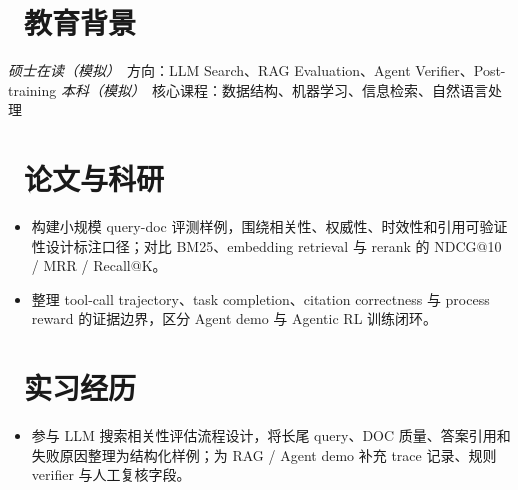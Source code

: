 \documentclass{resume}
\begin{document}


\small

\section{\faGraduationCap\ 教育背景}
\textit{硕士在读（模拟）}\ 方向：LLM Search、RAG Evaluation、Agent Verifier、Post-training
\datedsubsection{\textbf{某某大学}, 软件工程}{2021 -- 2025}
\textit{本科（模拟）}\ 核心课程：数据结构、机器学习、信息检索、自然语言处理

\section{\faBook\ 论文与科研}
\begin{itemize}[parsep=0.2ex]
  \item 构建小规模 query-doc 评测样例，围绕相关性、权威性、时效性和引用可验证性设计标注口径；对比 BM25、embedding retrieval 与 rerank 的 NDCG@10 / MRR / Recall@K。
\end{itemize}

\begin{itemize}[parsep=0.2ex]
  \item 整理 tool-call trajectory、task completion、citation correctness 与 process reward 的证据边界，区分 Agent demo 与 Agentic RL 训练闭环。
\end{itemize}

\section{\faBriefcase\ 实习经历}
\begin{itemize}[parsep=0.2ex]
  \item 参与 LLM 搜索相关性评估流程设计，将长尾 query、DOC 质量、答案引用和失败原因整理为结构化样例；为 RAG / Agent demo 补充 trace 记录、规则 verifier 与人工复核字段。
\end{itemize}
\end{document}
